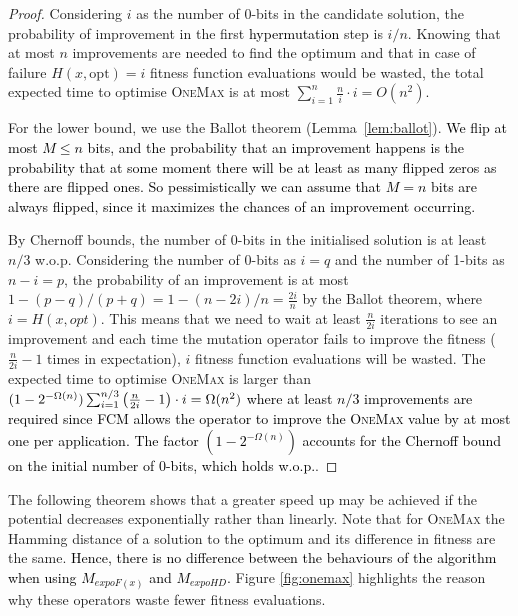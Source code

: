 \documentclass[lettersize,journal]{IEEEtran}
\newcommand{\new}[1]{\textcolor{black}{#1}}
\newcommand{\rerev}[1]{\textcolor{black}{#1}}
\begin{document}
\begin{proof}
Considering $i$ as the number of 0-bits in the candidate solution, the probability of improvement in the first \rerev{hypermutation} step is $i/n$. Knowing that at most $n$ improvements are needed to find the optimum and that in case of failure $H(x,\text{opt})=i$ fitness function evaluations would be wasted, the total expected time to optimise \textsc{OneMax} is at most $\sum_{i=1}^n \frac{n}{i} \cdot i =O(n^2)$.

For the lower bound, we use the Ballot theorem (Lemma~\ref{lem:ballot}). 
\new{We flip at most $M \le n$ bits, and the probability that an improvement happens is the probability that at some moment there will be at least as many flipped zeros as there are flipped ones. So pessimistically we can assume that  $M = n$ bits are always flipped, since it maximizes the chances of \rerev{an improvement occurring}.} 

By Chernoff bounds, the number of 0-bits in the initialised solution is at least $n/3$ w.o.p. Considering the number of 
0-bits as $i=q$ and the number of 1-bits as $n-i=p$, the probability of 
an improvement is at most $1-(p-q)/(p+q)=1-(n-2i)/n=\frac{2i}{n}$ by the Ballot theorem, where $i=H(x, opt)$. This means that we need to wait at least $\frac{n}{2i}$ iterations to see an improvement and each time the mutation operator fails to improve the fitness {(\color{black}$\frac{n}{2i} - 1$ times in expectation)}, $i$ fitness function evaluations will be wasted. The expected time to optimise \textsc{OneMax} is larger than \textcolor{black}{$(1-2^{-\Omega(n)})\sum_{i=1}^{n/3} {\color{black}\left(\frac{n}{2i}-1\right)} \cdot i = \Omega(n^2)$} \rerev{where at least $n/3$ improvements are required since FCM allows the operator to improve the \textsc{OneMax} value by at most one per application. The factor $(1-2^{-\Omega(n)})$ accounts for the Chernoff bound on the initial number of $0$-bits, which holds w.o.p.}.
\end{proof}

The following theorem shows that a greater speed up may be achieved if the potential decreases exponentially rather than linearly. Note that for \textsc{OneMax} the Hamming distance of a solution to the optimum and its difference in fitness are the same. \new{Hence, there is no difference between the behaviours of the algorithm when using $M_{expoF(x)}$ and $M_{expoHD}$.} 
Figure \ref{fig:onemax} highlights the reason why these operators waste fewer fitness evaluations.
\end{document}
